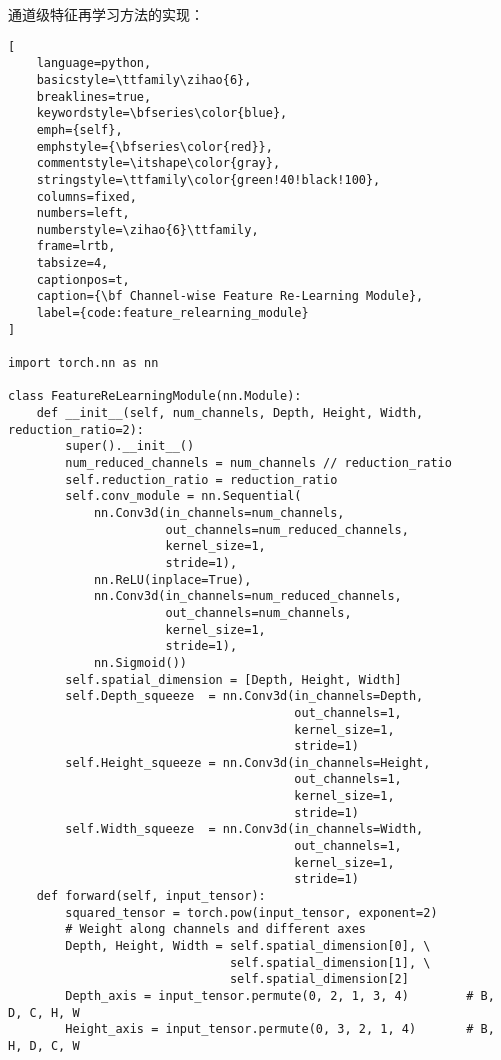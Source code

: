 通道级特征再学习方法的实现：
\begin{lstlisting}[
    language=python,
    basicstyle=\ttfamily\zihao{6},
    breaklines=true,
    keywordstyle=\bfseries\color{blue},
    emph={self},
    emphstyle={\bfseries\color{red}},
    commentstyle=\itshape\color{gray},
    stringstyle=\ttfamily\color{green!40!black!100},
    columns=fixed,
    numbers=left,
    numberstyle=\zihao{6}\ttfamily,
    frame=lrtb,
    tabsize=4,
    captionpos=t,
    caption={\bf Channel-wise Feature Re-Learning Module},
    label={code:feature_relearning_module}
]

import torch.nn as nn

class FeatureReLearningModule(nn.Module):
    def __init__(self, num_channels, Depth, Height, Width, reduction_ratio=2):
        super().__init__()
        num_reduced_channels = num_channels // reduction_ratio
        self.reduction_ratio = reduction_ratio
        self.conv_module = nn.Sequential(
            nn.Conv3d(in_channels=num_channels, 
                      out_channels=num_reduced_channels, 
                      kernel_size=1, 
                      stride=1),
            nn.ReLU(inplace=True),
            nn.Conv3d(in_channels=num_reduced_channels, 
                      out_channels=num_channels, 
                      kernel_size=1, 
                      stride=1),
            nn.Sigmoid())
        self.spatial_dimension = [Depth, Height, Width]
        self.Depth_squeeze  = nn.Conv3d(in_channels=Depth,  
                                        out_channels=1, 
                                        kernel_size=1, 
                                        stride=1)
        self.Height_squeeze = nn.Conv3d(in_channels=Height, 
                                        out_channels=1, 
                                        kernel_size=1, 
                                        stride=1)
        self.Width_squeeze  = nn.Conv3d(in_channels=Width,  
                                        out_channels=1, 
                                        kernel_size=1, 
                                        stride=1)
    def forward(self, input_tensor):
        squared_tensor = torch.pow(input_tensor, exponent=2)
        # Weight along channels and different axes
        Depth, Height, Width = self.spatial_dimension[0], \
                               self.spatial_dimension[1], \
                               self.spatial_dimension[2]
        Depth_axis = input_tensor.permute(0, 2, 1, 3, 4)        # B, D, C, H, W
        Height_axis = input_tensor.permute(0, 3, 2, 1, 4)       # B, H, D, C, W

\end{lstlisting}

